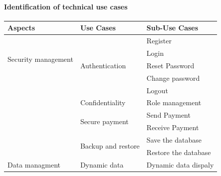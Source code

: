 \paragraph{Identification of technical use cases}

\begin{longtable}{|m{10em}|m{10em}|m{10em}|}\hline
  Aspects    &                  Use Cases                       & Sub-Use Cases                                       \\\hline

      \multirow{4}{*}{Security management} & \multirow{5}{*}{Authentication}          & Register                                                    \\\cline{3-3}
                                           &                                          & Login                                                       \\\cline{3-3}
                                           &                                          & Reset Password                                              \\\cline{3-3}
                                           &                                          & Change password                                             \\\cline{3-3}
                                           &                                          & Logout                                                      \\\cline{2-3}
                                           & \multirow{1}{*}{Confidentiality}         & Role management                                             \\\cline{2-3}
                                           & \multirow{2}{*}{Secure payment}          & Send Payment                                                \\\cline{3-3}
                                           &                                          & Receive Payment                                             \\\cline{2-3}
                                           & \multirow{2}{*}{Backup and restore}      & Save the database                                           \\\cline{3-3}
                                           &                                          & Restore the database                                       \\\hline
      \multirow{7}{*}{Data managment}      & \multirow{1}{*}{Dynamic data}            & Dynamic data dispaly                                       \\\cline{2-3}

\end{longtable}
